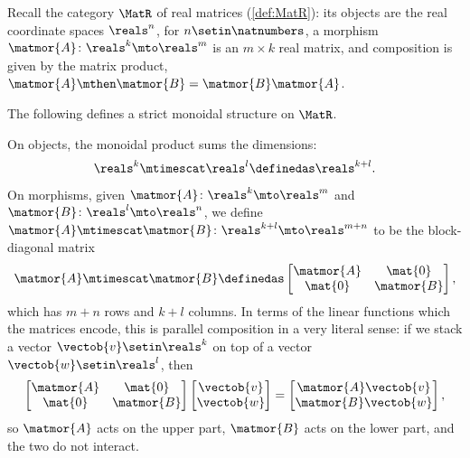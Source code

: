 \begin{example}
    \label{exa:MatR-strict-monoidal}
    Recall the category $\MatR$ of real matrices (\cref{def:MatR}): its objects are the real coordinate spaces $\reals^n$, for $n \setin \natnumbers$, a morphism $\matmor{A} \colon \reals^k \mto \reals^m$ is an $m \times k$ real matrix, and composition is given by the matrix product, $\matmor{A} \mthen \matmor{B} = \matmor{B}\matmor{A}$.

    The following defines a strict monoidal structure on $\MatR$.

    On objects, the monoidal product sums the dimensions:
    \begin{equation}
        \reals^k \mtimescat \reals^l \definedas \reals^{k+l}.
    \end{equation}
    On morphisms, given $\matmor{A} \colon \reals^k \mto \reals^m$ and $\matmor{B} \colon \reals^l \mto \reals^n$, we define $\matmor{A} \mtimescat \matmor{B} \colon \reals^{k+l} \mto \reals^{m+n}$ to be the block-diagonal matrix
    \begin{equation}
        \label{eq:MatR-monoidal-product}
        \matmor{A} \mtimescat \matmor{B} \definedas
        \begin{bmatrix}
            \matmor{A} & \mat{0}    \\
            \mat{0}    & \matmor{B}
        \end{bmatrix},
    \end{equation}
    which has $m + n$ rows and $k + l$ columns.
    In terms of the linear functions which the matrices encode, this is parallel composition in a very literal sense: if we stack a vector $\vectob{v} \setin \reals^k$ on top of a vector $\vectob{w} \setin \reals^l$, then
    \begin{equation}
        \begin{bmatrix}
            \matmor{A} & \mat{0}    \\
            \mat{0}    & \matmor{B}
        \end{bmatrix}
        \begin{bmatrix}
            \vectob{v} \\
            \vectob{w}
        \end{bmatrix}
        =
        \begin{bmatrix}
            \matmor{A}\vectob{v} \\
            \matmor{B}\vectob{w}
        \end{bmatrix},
    \end{equation}
    so $\matmor{A}$ acts on the upper part, $\matmor{B}$ acts on the lower part, and the two do not interact.


\end{example}
